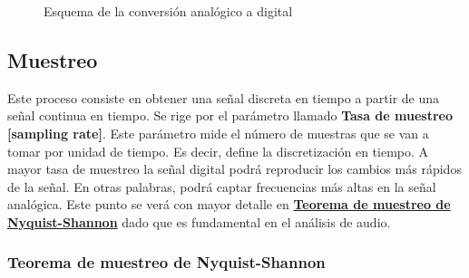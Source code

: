\begin{figure}[ht!]
	\centering
	\caption{Esquema de la conversión analógico a digital}
	\label{fig: adc_steps}
\end{figure}

\subsection{Muestreo}
Este proceso consiste en obtener una señal discreta en tiempo a partir de una señal continua en tiempo. Se rige por el parámetro llamado \textbf{Tasa de muestreo [sampling rate]}. Este parámetro mide el número de muestras que se van a tomar por unidad de tiempo. Es decir, define la discretización en tiempo. A mayor tasa de muestreo la señal digital podrá reproducir los cambios más rápidos de la señal. En otras palabras, podrá captar frecuencias más altas en la señal analógica. Este punto se verá con mayor detalle en \hyperref[subsec: nyquist]{\textbf{Teorema de muestreo de Nyquist-Shannon}} dado que es fundamental en el análisis de audio.

\subsubsection{Teorema de muestreo de Nyquist-Shannon}\label{subsec: nyquist}

